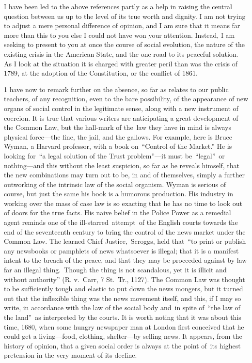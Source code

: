 \documentclass[twoside,symmetric,nobib,justified]{tufte-book}
\begin{document}
I have been led to the above references partly as a help in raising the
central question between us up to the level of its true worth and
dignity. I am not trying to adjust a mere personal difference of
opinion, and I am sure that it means far more than this to you else I
could not have won your attention. Instead, I am seeking to present to
you at once the course of social evolution, the nature of the existing
crisis in the American State, and the one road to its peaceful solution.
As I look at the situation it is charged with greater peril than was the
crisis of 1789, at the adoption of the Constitution, or the conflict of
1861.~

1 have now to remark further on the absence, so far as relates to our
public teachers, of any recognition, even to the bare possibility, of
the appearance of new organs of social control in the legitimate sense,
along with a new instrument of coercion. It is true that various writers
are anticipating a great development of the Common Law, but the
hall-mark of the~law they have in mind is always physical force---the
fine, the jail, and the gallows. For example, here is Bruce Wyman, a
Harvard professor, with a book on~``Control of the Market.'' He is
looking for~``a legal solution of the Trust problem''---it must
be~``legal''~or nothing---and this without the least suspicion, so far
as he reveals himself, that the new combinations may turn out to be, in
and of themselves, simply a further outworking of the intrinsic law of
the social organism. Wyman is serious of course, but just the same his
book is a humorous production. His industry in working over the mass of
case law is so exacting that he has no time to look out of doors for the
true facts. His naive belief in the Police Power as a remedial agent
reminds one of the ill-starred~attempt~of the English courts towards the
end of the seventeenth century to bring the control of the news market
under the Common Law. The learned Chief Justice,~Scroggs, held that~``to
print or publish any newsbooks or pamphlets of news whatsoever is
illegal; that it is a manifest intent to the breach of the peace, and
that they may be proceeded against by law far an illegal thing.~Though
the thing is not scandalous, yet it is illicit and without authority''
(R. v.~Carr, 7 St.~Tr., 1127). The Common Law was thought to be
sufficiently tough and elastic to put down the news mongers, but it
turned out that the inflexible thing was the news movement itself, and
this, if I may so write, in accordance with the law of the social body
and~in spite of~``the law of the land''~as interpreted by the courts. It
is worth noting that it was about this time, 1680, when some hungry
newspaper man at London first conceived that he could get a
living---food, clothing, shelter---by selling news. It appears, from the
history of opinion, that a given social order is always at the point
of~its highest pretension in the very moment of its decline.~~
\end{document}
